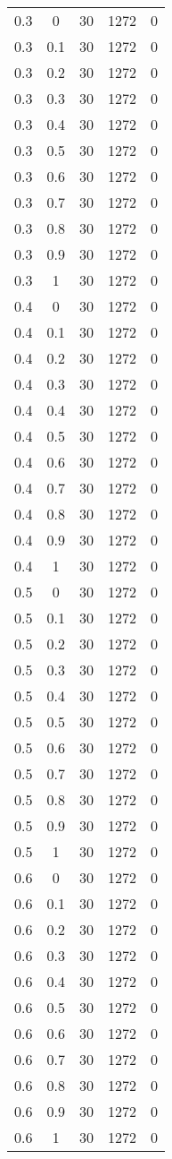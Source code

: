 \begin{longtable}{|c|c|c|c|c|}
	0.3& 0& 30& 1272& 0\\
	0.3& 0.1& 30& 1272& 0\\
	0.3& 0.2& 30& 1272& 0\\
	0.3& 0.3& 30& 1272& 0\\
	0.3& 0.4& 30& 1272& 0\\
	0.3& 0.5& 30& 1272& 0\\
	0.3& 0.6& 30& 1272& 0\\
	0.3& 0.7& 30& 1272& 0\\
	0.3& 0.8& 30& 1272& 0\\
	0.3& 0.9& 30& 1272& 0\\
	0.3& 1& 30& 1272& 0\\
	\hline
	
	0.4& 0& 30& 1272& 0\\
	0.4& 0.1& 30& 1272& 0\\
	0.4& 0.2& 30& 1272& 0\\
	0.4& 0.3& 30& 1272& 0\\
	0.4& 0.4& 30& 1272& 0\\
	0.4& 0.5& 30& 1272& 0\\
	0.4& 0.6& 30& 1272& 0\\
	0.4& 0.7& 30& 1272& 0\\
	0.4& 0.8& 30& 1272& 0\\
	0.4& 0.9& 30& 1272& 0\\
	0.4& 1& 30& 1272& 0\\
	\hline
	
	0.5& 0& 30& 1272& 0\\
	0.5& 0.1& 30& 1272& 0\\
	0.5& 0.2& 30& 1272& 0\\
	0.5& 0.3& 30& 1272& 0\\
	0.5& 0.4& 30& 1272& 0\\
	0.5& 0.5& 30& 1272& 0\\
	0.5& 0.6& 30& 1272& 0\\
	0.5& 0.7& 30& 1272& 0\\
	0.5& 0.8& 30& 1272& 0\\
	0.5& 0.9& 30& 1272& 0\\
	0.5& 1& 30& 1272& 0\\
	\hline
	
	0.6& 0& 30& 1272& 0\\
	0.6& 0.1& 30& 1272& 0\\
	0.6& 0.2& 30& 1272& 0\\
	0.6& 0.3& 30& 1272& 0\\
	0.6& 0.4& 30& 1272& 0\\
	0.6& 0.5& 30& 1272& 0\\
	0.6& 0.6& 30& 1272& 0\\
	0.6& 0.7& 30& 1272& 0\\
	0.6& 0.8& 30& 1272& 0\\
	0.6& 0.9& 30& 1272& 0\\
	0.6& 1& 30& 1272& 0\\
	\hline
	

\end{longtable}
